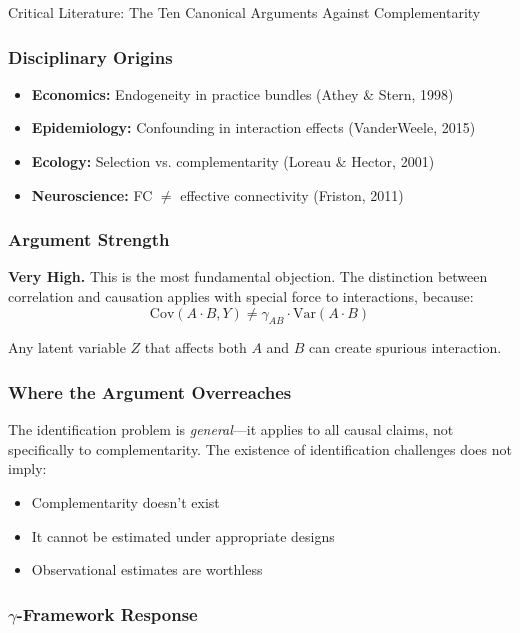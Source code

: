 \begin{chapter}{Critical Literature: The Ten Canonical Arguments Against Complementarity}
\subsubsection{Disciplinary Origins}

\begin{itemize}[noitemsep]
    \item \textbf{Economics:} Endogeneity in practice bundles (Athey \& Stern, 1998)
    \item \textbf{Epidemiology:} Confounding in interaction effects (VanderWeele, 2015)
    \item \textbf{Ecology:} Selection vs. complementarity (Loreau \& Hector, 2001)
    \item \textbf{Neuroscience:} FC $\neq$ effective connectivity (Friston, 2011)
\end{itemize}

\subsubsection{Argument Strength}

\textbf{Very High.} This is the most fundamental objection. The distinction between correlation and causation applies with special force to interactions, because:
\[
\text{Cov}(A \cdot B, Y) \neq \gamma_{AB} \cdot \text{Var}(A \cdot B)
\]

Any latent variable $Z$ that affects both $A$ and $B$ can create spurious interaction.

\subsubsection{Where the Argument Overreaches}

The identification problem is \textit{general}---it applies to all causal claims, not specifically to complementarity. The existence of identification challenges does not imply:
\begin{itemize}[noitemsep]
    \item Complementarity doesn't exist
    \item It cannot be estimated under appropriate designs
    \item Observational estimates are worthless
\end{itemize}

\subsubsection{$\gamma$-Framework Response}


\end{chapter}
